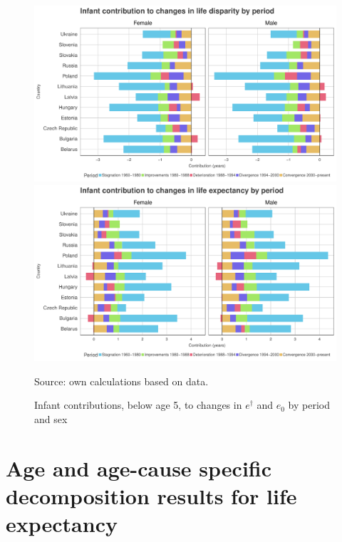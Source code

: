 \documentclass{article}
\begin{document}
\begin{figure}[h!]
\centering
\caption{Infant contributions, below age 5, to changes in $e^\dagger$ and $e_0$ by period and sex}
\label{Fig_LE&LD}
\begin{center}
\includegraphics[scale=.5]{Figures/Infant_ed_decomp.pdf}
\includegraphics[scale=.5]{Figures/Infant_ex_decomp.pdf}
\end{center}
Source: own calculations based on \citet{HMD} data. 
\end{figure}

\newpage

\section*{Age and age-cause specific decomposition results for life expectancy}
\end{document}
